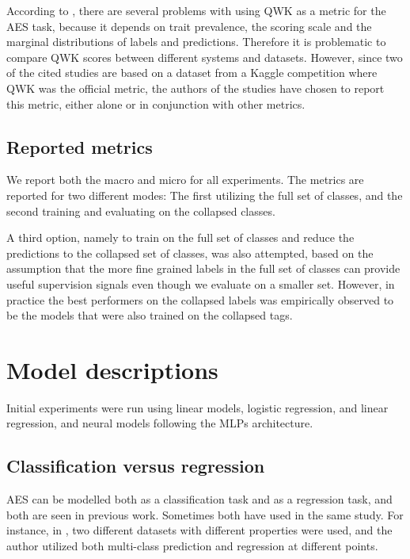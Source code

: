 According to \textcite{yannakoudakis2015evaluating}, there are several
problems with using \ac{QWK} as a metric for the \ac{AES} task, because it
depends on trait prevalence, the scoring scale and the marginal distributions
of labels and predictions. Therefore it is problematic to compare \ac{QWK}
scores between different systems and datasets. However, since two of the
cited studies are based on a dataset from a Kaggle competition where \ac{QWK}
was the official metric, the authors of the studies have chosen to report
this metric, either alone or in conjunction with other metrics.


\subsection{Reported metrics}

We report both the macro and micro \FI for all experiments. The metrics are
reported for two different modes: The first utilizing the full set of
classes, and the second training and evaluating on the collapsed classes.

A third option, namely to train on the full set of classes and reduce the
predictions to the collapsed set of classes, was also attempted, based on the
assumption that the more fine grained labels in the full set of classes can
provide useful supervision signals even though we evaluate on a smaller set.
However, in practice the best performers on the collapsed labels was
empirically observed to be the models that were also trained on the collapsed
tags.


\section{Model descriptions}

Initial experiments were run using linear models, logistic regression,
and linear regression, and neural models following the \acp{MLP} architecture.


\subsection{Classification versus regression}

\ac{AES} can be modelled both as a classification task and as a regression
task, and both are seen in previous work. Sometimes both have used in the
same study. For instance, in \textcite{vajjala17}, two different datasets
with different properties were used, and the author utilized both multi-class
prediction and regression at different points.

